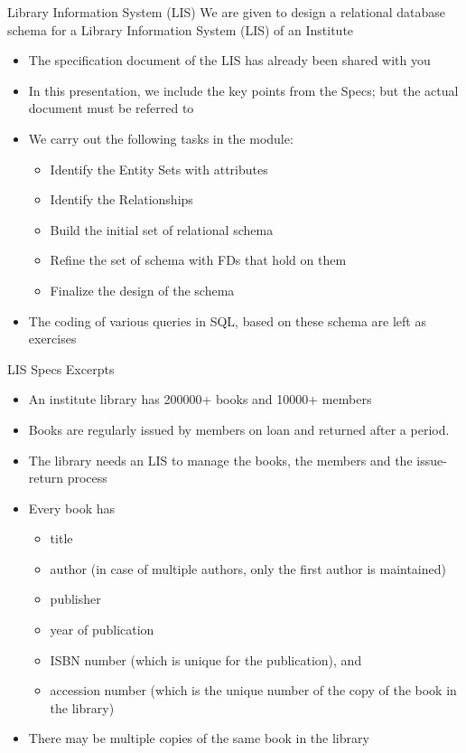 \documentclass[aspectratio=169, xcolor=dvipsnames]{beamer}
\begin{document}
\begin{frame}{Library Information System (LIS)}
    We are given to design a relational database schema for a Library Information System (LIS) of an Institute
    \begin{itemize}[<+->]
        \item The specification document of the LIS has already been shared with you
        \item In this presentation, we include the key points from the Specs; but the actual document must be referred to
        \item We carry out the following tasks in the module:
        \begin{itemize}
            \item[$\triangleright$] Identify the Entity Sets with attributes
            \item[$\triangleright$] Identify the Relationships
            \item[$\triangleright$] Build the initial set of relational schema
            \item[$\triangleright$] Refine the set of schema with FDs that hold on them
            \item[$\triangleright$] Finalize the design of the schema
        \end{itemize}
        \item The coding of various queries in SQL, based on these schema are left as exercises
    \end{itemize}
\end{frame}

\begin{frame}{LIS Specs Excerpts}
    \begin{itemize}[<+->]
        \item An institute library has 200000+ books and 10000+ members
        \item Books are regularly issued by members on loan and returned after a period.
        \item The library needs an LIS to manage the books, the members and the issue-return process
        \item Every book has
        \begin{itemize}
            \item[$\triangleright$] title
            \item[$\triangleright$] author (in case of multiple authors, only the first author is maintained)
            \item[$\triangleright$] publisher
            \item[$\triangleright$] year of publication
            \item[$\triangleright$] ISBN number (which is unique for the publication), and
            \item[$\triangleright$] accession number (which is the unique number of the copy of the book in the library)
        \end{itemize}
        \item There may be multiple copies of the same book in the library
    \end{itemize}
\end{frame}
\end{document}
